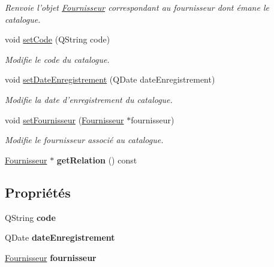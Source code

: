 \begin{DoxyCompactItemize}
\begin{DoxyCompactList}\small\item\em Renvoie l'objet \hyperlink{class_core_1_1_fournisseur}{Fournisseur} correspondant au fournisseur dont émane le catalogue. \item\end{DoxyCompactList}\item 
void \hyperlink{class_core_1_1_catalogue_a065f70f6b69ff02593e0be7813142be4}{setCode} (QString code)
\begin{DoxyCompactList}\small\item\em Modifie le code du catalogue. \item\end{DoxyCompactList}\item 
void \hyperlink{class_core_1_1_catalogue_a722b8c534479e7aad59a7d425250617c}{setDateEnregistrement} (QDate dateEnregistrement)
\begin{DoxyCompactList}\small\item\em Modifie la date d'enregistrement du catalogue. \item\end{DoxyCompactList}\item 
void \hyperlink{class_core_1_1_catalogue_a5f1c6cd886338385a95ce8105dfd48e1}{setFournisseur} (\hyperlink{class_core_1_1_fournisseur}{Fournisseur} $\ast$fournisseur)
\begin{DoxyCompactList}\small\item\em Modifie le fournisseur associé au catalogue. \item\end{DoxyCompactList}\item 
\hypertarget{class_core_1_1_catalogue_a4ec6a17ae60cd156cfb26948a95aeb6e}{
\hyperlink{class_core_1_1_fournisseur}{Fournisseur} $\ast$ {\bfseries getRelation} () const }
\label{de/d33/class_core_1_1_catalogue_a4ec6a17ae60cd156cfb26948a95aeb6e}

\end{DoxyCompactItemize}
\subsection*{Propriétés}
\begin{DoxyCompactItemize}
\item 
\hypertarget{class_core_1_1_catalogue_a8821131af357a9b16ae6b94b4a981eff}{
QString {\bfseries code}}
\label{de/d33/class_core_1_1_catalogue_a8821131af357a9b16ae6b94b4a981eff}

\item 
\hypertarget{class_core_1_1_catalogue_a48107e765325b571457934fbb91eef1b}{
QDate {\bfseries dateEnregistrement}}
\label{de/d33/class_core_1_1_catalogue_a48107e765325b571457934fbb91eef1b}

\item 
\hypertarget{class_core_1_1_catalogue_a39f10786cea1e953b528ef7ba5af054a}{
\hyperlink{class_core_1_1_fournisseur}{Fournisseur} {\bfseries fournisseur}}
\label{de/d33/class_core_1_1_catalogue_a39f10786cea1e953b528ef7ba5af054a}

\end{DoxyCompactItemize}


